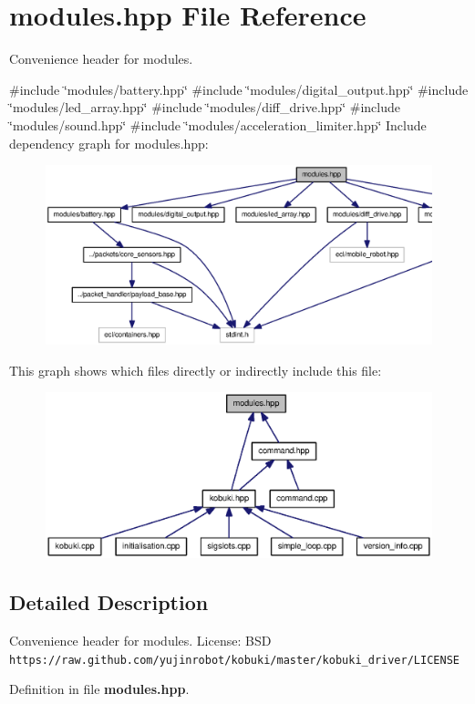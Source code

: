 \section{modules.\-hpp \-File \-Reference}
\label{modules_8hpp}


\-Convenience header for modules.  


{\ttfamily \#include \char`\"{}modules/battery.\-hpp\char`\"{}}\*
{\ttfamily \#include \char`\"{}modules/digital\-\_\-output.\-hpp\char`\"{}}\*
{\ttfamily \#include \char`\"{}modules/led\-\_\-array.\-hpp\char`\"{}}\*
{\ttfamily \#include \char`\"{}modules/diff\-\_\-drive.\-hpp\char`\"{}}\*
{\ttfamily \#include \char`\"{}modules/sound.\-hpp\char`\"{}}\*
{\ttfamily \#include \char`\"{}modules/acceleration\-\_\-limiter.\-hpp\char`\"{}}\*
\-Include dependency graph for modules.\-hpp\-:
\nopagebreak
\begin{figure}[H]
\begin{center}
\leavevmode
\includegraphics[width=350pt]{modules_8hpp__incl}
\end{center}
\end{figure}
\-This graph shows which files directly or indirectly include this file\-:
\nopagebreak
\begin{figure}[H]
\begin{center}
\leavevmode
\includegraphics[width=350pt]{modules_8hpp__dep__incl}
\end{center}
\end{figure}


\subsection{\-Detailed \-Description}
\-Convenience header for modules. \-License\-: \-B\-S\-D {\tt https\-://raw.\-github.\-com/yujinrobot/kobuki/master/kobuki\-\_\-driver/\-L\-I\-C\-E\-N\-S\-E} 

\-Definition in file {\bf modules.\-hpp}.

